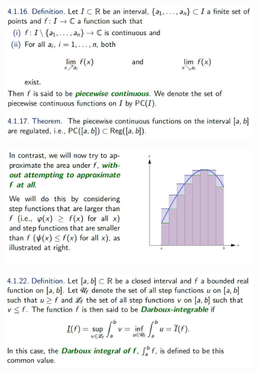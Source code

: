 \documentclass{beamer}
\begin{document}
\begin{frame}
    \begin{figure}[htbp]
        \centering
        \includegraphics[width=12cm]{pic10.png}
    \end{figure}
\end{frame}

\begin{frame}
    \begin{figure}[htbp]
        \centering
        \includegraphics[width=12cm]{pic11.png}
    \end{figure}
\end{frame}

\begin{frame}
    \begin{figure}[htbp]
        \centering
        \includegraphics[width=12cm]{pic12.png}
    \end{figure}
\end{frame}
\end{document}
